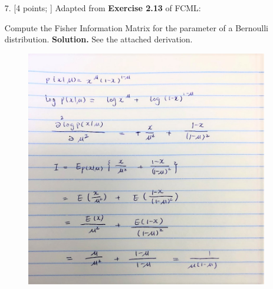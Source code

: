 \documentclass[10pt]{article}
\begin{document}
\begin{itemize}
\item[7.] [4 points; \boldred{Required only for Graduates}]
Adapted from {\bf Exercise 2.13} of FCML:

Compute the Fisher Information Matrix for the parameter of a Bernoulli distribution.
\FloatBarrier
{\bf Solution.} See the attached derivation.
\begin{figure}[h!]
\begin{center}
\includegraphics[scale= 0.5]{./figures/ex7.jpg}
\end{center}
\end{figure}


\end{itemize}
\end{document}
